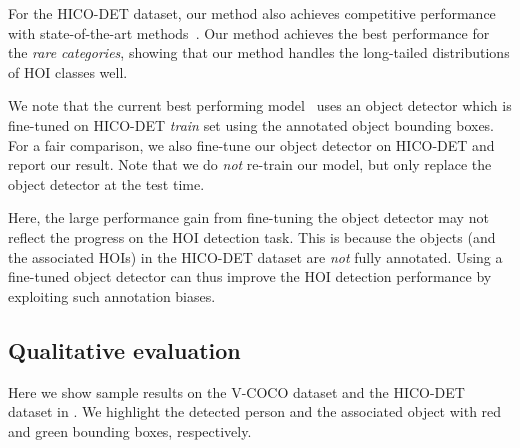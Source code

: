 For the HICO-DET dataset, our method also achieves competitive performance with state-of-the-art methods~\cite{Alex-No-Frills,Li-CVPR-Interactiveness,Bo-PMFNet,Peyre-ICCV-Weakly}.
Our method achieves the best performance for the \emph{rare categories}, showing that our method handles the long-tailed distributions of HOI classes well.


We note that the current best performing model~\cite{bansal2019detecting} uses an object detector which is fine-tuned on HICO-DET \emph{train} set using the annotated object bounding boxes.
For a fair comparison, we also fine-tune our object detector on HICO-DET and report our result.
Note that we do \emph{not} re-train our model, but only replace the object detector at the test time.

Here, the large performance gain from fine-tuning the object detector may not reflect the progress on the HOI detection task.
This is because the objects (and the associated HOIs) in the HICO-DET dataset are \emph{not} fully annotated. 
Using a fine-tuned object detector can thus improve the HOI detection performance by exploiting such annotation biases. 








\vspace{-2.0mm}
\subsection{Qualitative evaluation}



Here we show sample results on the V-COCO dataset and the HICO-DET dataset in . We highlight the detected person and the associated object with red and green bounding boxes, respectively.


